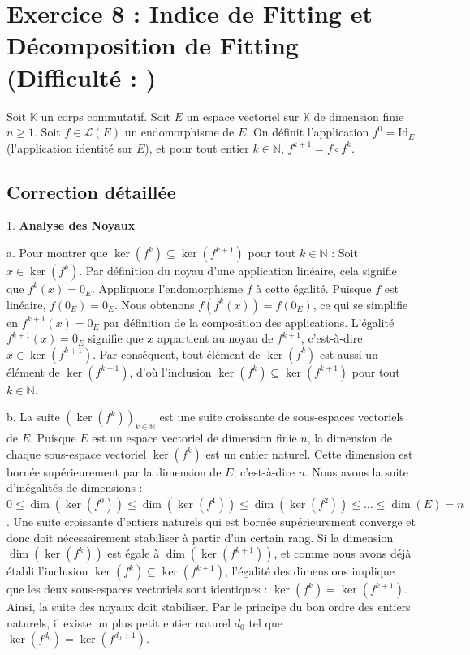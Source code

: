 \documentclass{report}
\begin{document}
\newpage
\chapter*{Exercice 8 : Indice de Fitting et Décomposition de Fitting (Difficulté : \textbf{})}

Soit $\mathbb{K}$ un corps commutatif.
Soit $E$ un espace vectoriel sur $\mathbb{K}$ de dimension finie $n \ge 1$.
Soit $f \in \mathcal{L}(E)$ un endomorphisme de $E$.
On définit l'application $f^0 = \text{Id}_E$ (l'application identité sur $E$), et pour tout entier $k \in \mathbb{N}$, $f^{k+1} = f \circ f^k$.



\section*{Correction détaillée}

1.  \textbf{Analyse des Noyaux}

    a.  Pour montrer que $\ker(f^k) \subseteq \ker(f^{k+1})$ pour tout $k \in \mathbb{N}$ :
        Soit $x \in \ker(f^k)$. Par définition du noyau d'une application linéaire, cela signifie que $f^k(x) = 0_E$.
        Appliquons l'endomorphisme $f$ à cette égalité. Puisque $f$ est linéaire, $f(0_E) = 0_E$.
        Nous obtenons $f(f^k(x)) = f(0_E)$, ce qui se simplifie en $f^{k+1}(x) = 0_E$ par définition de la composition des applications.
        L'égalité $f^{k+1}(x) = 0_E$ signifie que $x$ appartient au noyau de $f^{k+1}$, c'est-à-dire $x \in \ker(f^{k+1})$.
        Par conséquent, tout élément de $\ker(f^k)$ est aussi un élément de $\ker(f^{k+1})$, d'où l'inclusion $\ker(f^k) \subseteq \ker(f^{k+1})$ pour tout $k \in \mathbb{N}$.

    b.  La suite $(\ker(f^k))_{k \in \mathbb{N}}$ est une suite croissante de sous-espaces vectoriels de $E$.
        Puisque $E$ est un espace vectoriel de dimension finie $n$, la dimension de chaque sous-espace vectoriel $\ker(f^k)$ est un entier naturel. Cette dimension est bornée supérieurement par la dimension de $E$, c'est-à-dire $n$.
        Nous avons la suite d'inégalités de dimensions :
        $0 \le \dim(\ker(f^0)) \le \dim(\ker(f^1)) \le \dim(\ker(f^2)) \le \dots \le \dim(E) = n$.
        Une suite croissante d'entiers naturels qui est bornée supérieurement converge et donc doit nécessairement stabiliser à partir d'un certain rang.
        Si la dimension $\dim(\ker(f^k))$ est égale à $\dim(\ker(f^{k+1}))$, et comme nous avons déjà établi l'inclusion $\ker(f^k) \subseteq \ker(f^{k+1})$, l'égalité des dimensions implique que les deux sous-espaces vectoriels sont identiques : $\ker(f^k) = \ker(f^{k+1})$.
        Ainsi, la suite des noyaux doit stabiliser. Par le principe du bon ordre des entiers naturels, il existe un plus petit entier naturel $d_0$ tel que $\ker(f^{d_0}) = \ker(f^{d_0+1})$.
\end{document}

